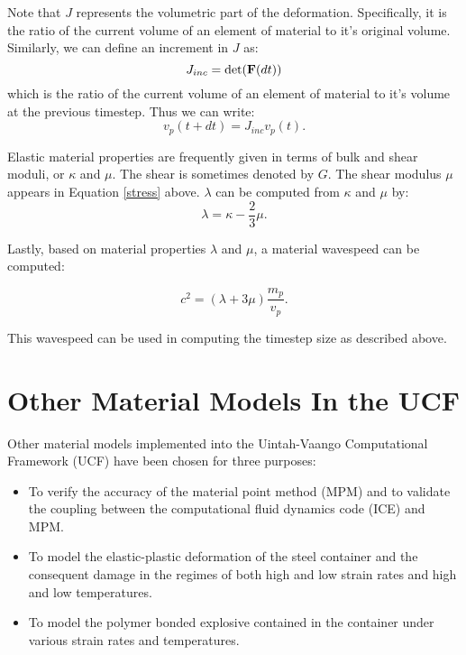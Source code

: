 Note that $J$ represents the volumetric part of the deformation.  
Specifically, it is the ratio of the current volume of an 
element of material to it's original volume.  Similarly, we can
define an increment in $J$ as:
\begin{equation}
	J_{inc} = \det(\mbox{\ensuremath{\mathbf{F}}}(dt))
\end{equation}
which  is the ratio of the current volume of an element of 
material to it's volume at the previous timestep.  Thus we can 
write:
\begin{equation}
	v_p(t+dt) = J_{inc} v_p(t).
\end{equation}

Elastic material properties are frequently given in terms of 
bulk and shear moduli, or $\kappa$ and $\mu$.  The shear is 
sometimes denoted by $G$.  The shear modulus $\mu$ appears in 
Equation \ref{stress} above.  $\lambda$ can be computed from
$\kappa$ and $\mu$ by:
\begin{equation}
	\lambda = \kappa - \frac{2}{3}\mu.
\end{equation}

Lastly, based on material properties $\lambda$ and $\mu$, a material 
wavespeed can be computed:

\begin{equation}
	c^2 = (\lambda + 3 \mu)\frac{m_p}{v_p}.
\end{equation}

This wavespeed can be used in computing the timestep size as 
described above.

\section{Other Material Models In the UCF}
Other material models implemented into the Uintah-Vaango Computational
Framework (UCF) have been chosen for three purposes:
\begin{itemize}
  \item To verify the accuracy of the material point method (MPM)
        and to validate the coupling between the computational fluid 
        dynamics code (ICE) and MPM.
  \item To model the elastic-plastic deformation of the steel
        container and the consequent damage in the regimes of 
        both high and low strain rates and high and low temperatures.
  \item To model the polymer bonded explosive contained in the 
        container under various strain rates and temperatures.
\end{itemize}

